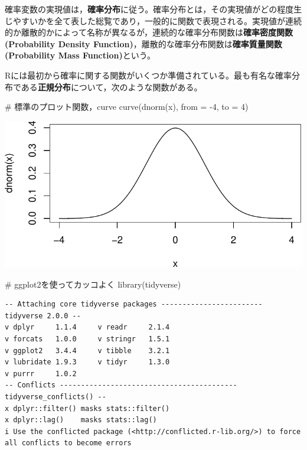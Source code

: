 \documentclass[
  a4paper,
]{ltjsbook}
\newenvironment{Shaded}{\begin{snugshade}}{\end{snugshade}}
\newcommand{\AttributeTok}[1]{\textcolor[rgb]{0.40,0.45,0.13}{#1}}
\newcommand{\CommentTok}[1]{\textcolor[rgb]{0.37,0.37,0.37}{#1}}
\newcommand{\DecValTok}[1]{\textcolor[rgb]{0.68,0.00,0.00}{#1}}
\newcommand{\FunctionTok}[1]{\textcolor[rgb]{0.28,0.35,0.67}{#1}}
\newcommand{\NormalTok}[1]{\textcolor[rgb]{0.00,0.23,0.31}{#1}}
\newcommand{\SpecialCharTok}[1]{\textcolor[rgb]{0.37,0.37,0.37}{#1}}
\begin{document}
確率変数の実現値は，\textbf{確率分布}に従う。確率分布とは，その実現値がどの程度生じやすいかを全て表した総覧であり，一般的に関数で表現される。実現値が連続的か離散的かによって名称が異なるが，連続的な確率分布関数は\textbf{確率密度関数(Probability
Density
Function)}，離散的な確率分布関数は\textbf{確率質量関数(Probability Mass
Function)}という。

Rには最初から確率に関する関数がいくつか準備されている。最も有名な確率分布である\textbf{正規分布}について，次のような関数がある。

\begin{Shaded}
\begin{Highlighting}[]
\CommentTok{\# 標準のプロット関数，curve}
\FunctionTok{curve}\NormalTok{(}\FunctionTok{dnorm}\NormalTok{(x), }\AttributeTok{from =} \SpecialCharTok{{-}}\DecValTok{4}\NormalTok{, }\AttributeTok{to =} \DecValTok{4}\NormalTok{)}
\end{Highlighting}
\end{Shaded}

\includegraphics{chapter06_files/figure-pdf/normal-1.pdf}

\begin{Shaded}
\begin{Highlighting}[]
\CommentTok{\# ggplot2を使ってカッコよく}
\FunctionTok{library}\NormalTok{(tidyverse)}
\end{Highlighting}
\end{Shaded}

\begin{verbatim}
-- Attaching core tidyverse packages ------------------------ tidyverse 2.0.0 --
v dplyr     1.1.4     v readr     2.1.4
v forcats   1.0.0     v stringr   1.5.1
v ggplot2   3.4.4     v tibble    3.2.1
v lubridate 1.9.3     v tidyr     1.3.0
v purrr     1.0.2     
-- Conflicts ------------------------------------------ tidyverse_conflicts() --
x dplyr::filter() masks stats::filter()
x dplyr::lag()    masks stats::lag()
i Use the conflicted package (<http://conflicted.r-lib.org/>) to force all conflicts to become errors
\end{verbatim}
\end{document}
